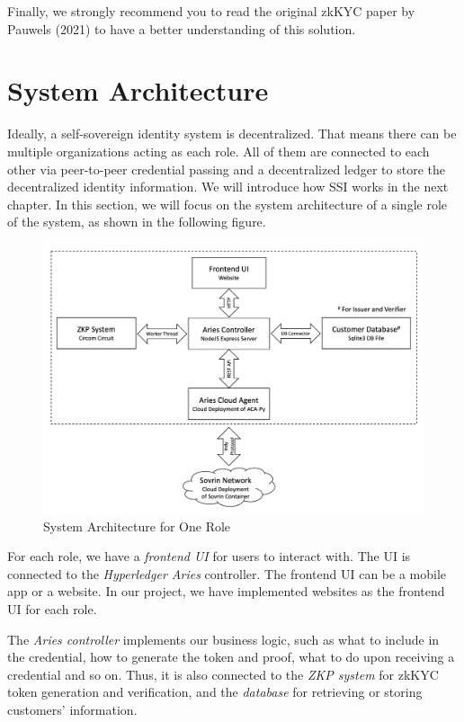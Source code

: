 \documentclass[
]{report}
\begin{document}
Finally, we strongly recommend you to read the original zkKYC paper by
Pauwels (2021) to have a better understanding of this solution.

\section{System Architecture}
Ideally, a self-sovereign identity system is decentralized. That means
there can be multiple organizations acting as each role. All of them
are connected to each other via peer-to-peer credential passing and
a decentralized ledger to store the decentralized identity information.
We will introduce how SSI works in the next chapter. In this section,
we will focus on the system architecture of a single role of the system,
as shown in the following figure.


\begin{figure}[h]
\centering
\includegraphics[width=14cm]{sys-arch.png}
\caption{System Architecture for One Role}
\end{figure}

For each role, we have a \emph{frontend UI} for users to interact with. The UI
is connected to the \emph{Hyperledger Aries} controller. The frontend UI
can be a mobile app or a website. In our project, we have implemented
websites as the frontend UI for each role.

The \emph{Aries controller} implements our business logic, such as what to
include in the credential, how to generate the token and proof, what
to do upon receiving a credential and so on. Thus, it is also connected
to the \emph{ZKP system} for zkKYC token generation and verification,
and the \emph{database} for retrieving or storing customers' information.
\end{document}
